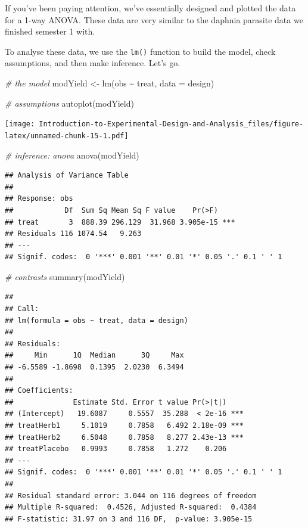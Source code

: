 \documentclass[
]{book}
\newenvironment{Shaded}{\begin{snugshade}}{\end{snugshade}}
\newcommand{\AttributeTok}[1]{\textcolor[rgb]{0.77,0.63,0.00}{#1}}
\newcommand{\CommentTok}[1]{\textcolor[rgb]{0.56,0.35,0.01}{\textit{#1}}}
\newcommand{\FunctionTok}[1]{\textcolor[rgb]{0.00,0.00,0.00}{#1}}
\newcommand{\NormalTok}[1]{#1}
\newcommand{\OtherTok}[1]{\textcolor[rgb]{0.56,0.35,0.01}{#1}}
\newcommand{\SpecialCharTok}[1]{\textcolor[rgb]{0.00,0.00,0.00}{#1}}
\begin{document}
If you've been paying attention, we've essentially designed and plotted the data for a 1-way ANOVA. These data are very similar to the daphnia parasite data we finished semester 1 with.

To analyse these data, we use the \texttt{lm()} function to build the model, check assumptions, and then make inference. Let's go.

\begin{Shaded}
\begin{Highlighting}[]
\CommentTok{\# the model}
\NormalTok{modYield }\OtherTok{\textless{}{-}} \FunctionTok{lm}\NormalTok{(obs }\SpecialCharTok{\textasciitilde{}}\NormalTok{ treat, }\AttributeTok{data =}\NormalTok{ design)}

\CommentTok{\# assumptions}
\FunctionTok{autoplot}\NormalTok{(modYield)}
\end{Highlighting}
\end{Shaded}

\texttt{[image: Introduction-to-Experimental-Design-and-Analysis\_files/figure-latex/unnamed-chunk-15-1.pdf]}

\begin{Shaded}
\begin{Highlighting}[]
\CommentTok{\# inference: anova}
\FunctionTok{anova}\NormalTok{(modYield)}
\end{Highlighting}
\end{Shaded}

\begin{verbatim}
## Analysis of Variance Table
## 
## Response: obs
##            Df  Sum Sq Mean Sq F value    Pr(>F)    
## treat       3  888.39 296.129  31.968 3.905e-15 ***
## Residuals 116 1074.54   9.263                      
## ---
## Signif. codes:  0 '***' 0.001 '**' 0.01 '*' 0.05 '.' 0.1 ' ' 1
\end{verbatim}

\begin{Shaded}
\begin{Highlighting}[]
\CommentTok{\# contrasts}
\FunctionTok{summary}\NormalTok{(modYield)}
\end{Highlighting}
\end{Shaded}

\begin{verbatim}
## 
## Call:
## lm(formula = obs ~ treat, data = design)
## 
## Residuals:
##     Min      1Q  Median      3Q     Max 
## -6.5589 -1.8698  0.1395  2.0230  6.3494 
## 
## Coefficients:
##              Estimate Std. Error t value Pr(>|t|)    
## (Intercept)   19.6087     0.5557  35.288  < 2e-16 ***
## treatHerb1     5.1019     0.7858   6.492 2.18e-09 ***
## treatHerb2     6.5048     0.7858   8.277 2.43e-13 ***
## treatPlacebo   0.9993     0.7858   1.272    0.206    
## ---
## Signif. codes:  0 '***' 0.001 '**' 0.01 '*' 0.05 '.' 0.1 ' ' 1
## 
## Residual standard error: 3.044 on 116 degrees of freedom
## Multiple R-squared:  0.4526, Adjusted R-squared:  0.4384 
## F-statistic: 31.97 on 3 and 116 DF,  p-value: 3.905e-15
\end{verbatim}
\end{document}
